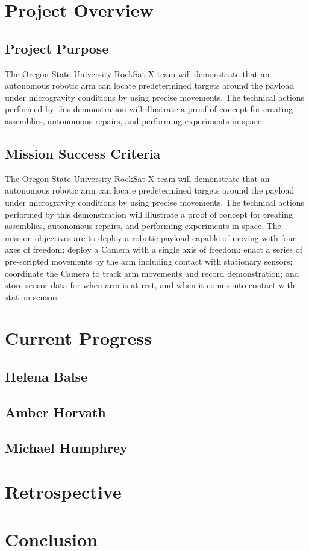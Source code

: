 \documentclass[letterpaper,10pt]{article}
\begin{document}
\section{Project Overview}
\subsection{Project Purpose}
The Oregon State University RockSat-X team will demonstrate that an autonomous robotic arm can locate predetermined
 targets around the payload under microgravity conditions by using precise movements. 
The technical actions performed by this demonstration will illustrate a proof of concept for creating assemblies, 
autonomous repairs, and performing experiments in space.
\subsection{Mission Success Criteria}
The Oregon State University RockSat-X team will demonstrate that an autonomous robotic arm can locate predetermined targets around the 
payload under microgravity conditions by using precise movements. The technical actions performed by this demonstration will illustrate 
a proof of concept for creating assemblies, autonomous repairs, and performing experiments in space. 
The mission objectives are to deploy a robotic payload capable of moving with four axes of freedom; deploy a Camera with a single axis 
of freedom;
enact a series of pre-scripted movements by the arm including contact with stationary sensors;
coordinate the Camera to track arm movements and record demonstration; and
store sensor data for when arm is at rest, and when it comes into contact with station sensors.
\section{Current Progress}
\subsection{Helena Balse}

\subsection{Amber Horvath}

\subsection{Michael Humphrey}

\section{Retrospective}


\section{Conclusion}
\end{document}

